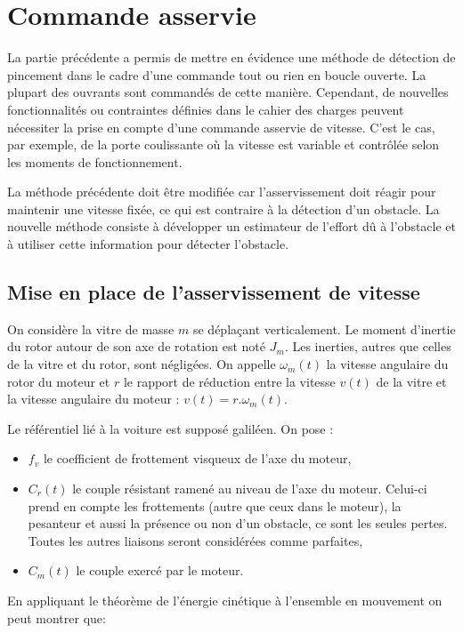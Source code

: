\section{Commande asservie}

La partie précédente a permis de mettre en évidence une méthode de détection de pincement dans le cadre d'une commande tout ou rien en boucle ouverte. La plupart des ouvrants sont commandés de cette manière. Cependant, de nouvelles fonctionnalités ou contraintes définies dans le cahier des charges peuvent nécessiter la prise en compte d'une commande asservie de vitesse. C'est le cas, par exemple, de la porte coulissante où la vitesse est variable et contrôlée selon les moments de fonctionnement.

La méthode précédente doit être modifiée car l'asservissement doit réagir pour maintenir une vitesse fixée, ce qui est contraire à la détection d'un obstacle. La nouvelle méthode consiste à développer un estimateur de l'effort dû à l'obstacle et à utiliser cette information pour détecter l'obstacle.

\subsection{Mise en place de l'asservissement de vitesse}

On considère la vitre de masse $m$ se déplaçant verticalement. Le moment d'inertie du rotor autour de son axe de rotation est noté $J_m$. Les inerties, autres que celles de la vitre et du rotor, sont négligées. On appelle $\omega_m(t)$ la vitesse angulaire du rotor du moteur et $r$ le rapport de réduction entre la vitesse $v(t)$ de la vitre et la vitesse angulaire du moteur : $v(t) = r.\omega_m(t)$.

Le référentiel lié à la voiture est supposé galiléen. On pose :
\begin{itemize}
 \item $f_v$ le coefficient de frottement visqueux de l'axe du moteur,
 \item $C_r(t)$ le couple résistant ramené au niveau de l'axe du moteur. Celui-ci prend en compte les frottements (autre que ceux dans le moteur), la pesanteur et aussi la présence ou non d'un obstacle, ce sont les seules pertes. Toutes les autres liaisons seront considérées comme parfaites,
 \item $C_m(t)$ le couple exercé par le moteur.
\end{itemize} 

En appliquant le théorème de l'énergie cinétique à l'ensemble en mouvement on peut montrer que:

